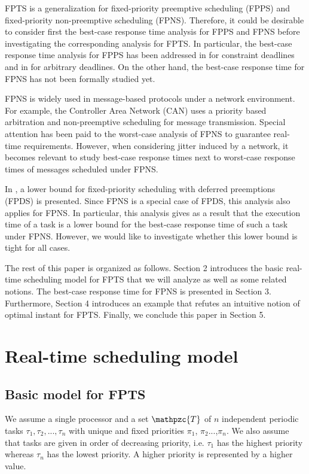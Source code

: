 \documentclass[conference,compsoc]{IEEEtran}
\begin{document}
FPTS is a generalization for fixed-priority preemptive scheduling (FPPS) and fixed-priority non-preemptive scheduling (FPNS). Therefore, it could be desirable to consider first the best-case response time analysis for FPPS and FPNS before investigating the corresponding analysis for FPTS. In particular, the best-case response time analysis for FPPS has been addressed in \cite{LM80} for constraint deadlines and in \cite{BLM13} for arbitrary deadlines. On the other hand, the best-case response time for FPNS has not been formally studied yet. 

FPNS is widely used in message-based protocols under a network environment. For example, the Controller Area Network (CAN) uses a priority based arbitration and non-preemptive scheduling for message transmission. Special attention has been paid to the worst-case analysis of FPNS \cite{DBBL07} to guarantee real-time requirements. However, when considering jitter induced by a network, it becomes relevant to study best-case response times next to worst-case response times of messages scheduled under FPNS.

In \cite{BV05}, a lower bound for fixed-priority scheduling with deferred preemptions (FPDS) is presented. Since FPNS is a special case of FPDS, this analysis also applies for FPNS. In particular, this analysis gives as a result that the execution time of a task is a lower bound for the best-case response time of such a task under FPNS. However, we would like to investigate whether this lower bound is tight for all cases.

The rest of this paper is organized as follows. Section 2 introduces the basic real-time scheduling model for FPTS that we will analyze as well as some related notions. The best-case response time for FPNS is presented in Section 3. Furthermore, Section 4 introduces an example that refutes an intuitive notion of optimal instant for FPTS. Finally, we conclude this paper in Section 5.

\section{Real-time scheduling model}

\subsection{Basic model for FPTS}
We assume a single processor and a set $\mathpzc{T}$ of $n$ independent periodic tasks $\tau_1,\tau_2,...,\tau_n$ with unique and fixed priorities $\pi_{1}$, $\pi_{2}$...,$\pi_{n}$. We also assume that tasks are given in order of decreasing priority, i.e. $\tau_1$ has the highest priority whereas $\tau_n$ has the lowest priority. A higher priority is represented by a higher value.
\end{document}
